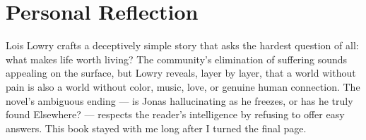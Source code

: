 \section{Personal Reflection}

Lois Lowry crafts a deceptively simple story that asks the hardest question of all: what makes life worth living? The community's elimination of suffering sounds appealing on the surface, but Lowry reveals, layer by layer, that a world without pain is also a world without color, music, love, or genuine human connection. The novel's ambiguous ending --- is Jonas hallucinating as he freezes, or has he truly found Elsewhere? --- respects the reader's intelligence by refusing to offer easy answers. This book stayed with me long after I turned the final page.

\vspace{6pt}

